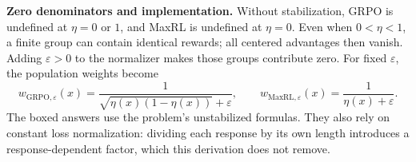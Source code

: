 \documentclass[11pt,a4paper]{article}
\begin{document}
\textbf{Zero denominators and implementation.}
Without stabilization, GRPO is undefined at $\eta=0$ or $1$, and MaxRL is
undefined at $\eta=0$. Even when $0<\eta<1$, a finite group can contain identical
rewards; all centered advantages then vanish. Adding $\varepsilon>0$ to the
normalizer makes those groups contribute zero. For fixed $\varepsilon$, the
population weights become
\begin{equation}
  w_{\mathrm{GRPO},\varepsilon}(x)
    =\frac{1}{\sqrt{\eta(x)(1-\eta(x))}+\varepsilon},
  \qquad
  w_{\mathrm{MaxRL},\varepsilon}(x)
    =\frac{1}{\eta(x)+\varepsilon}.
\end{equation}
The boxed answers use the problem's unstabilized formulas. They also rely on
constant loss normalization: dividing each response by its own length
introduces a response-dependent factor, which this derivation does not remove.
\end{document}
